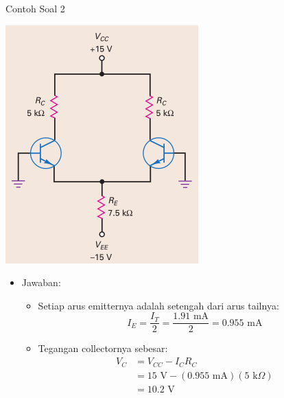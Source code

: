 \documentclass[aspectratio=169]{beamer}
\begin{document}
\begin{frame}{Contoh Soal 2}
	\begin{multicols}{2}
		\begin{center}
			\includegraphics[width=0.6\textheight]{gambar/01.diff-amp/01.latihan_soal_1a}
		\end{center}
		\columnbreak
		\begin{itemize}
			\item Jawaban:
			\begin{itemize}
				\item Setiap arus emitternya adalah setengah dari arus tailnya:
				\[ I_E = \frac{I_T}{2} = \frac{1.91 \text{ mA}}{2} = 0.955 \text{ mA} \]
				\item Tegangan collectornya sebesar:
				\begin{align*}
					V_C &= V_{CC} - I_C R_C \\
					&= 15 \text{ V} - (0.955 \text{ mA})(5 \text{ k}\Omega) \\
					&= 10.2 \text{ V}
				\end{align*}
			\end{itemize}
		\end{itemize}
		\vfill\null
	\end{multicols}
\end{frame}
\end{document}
